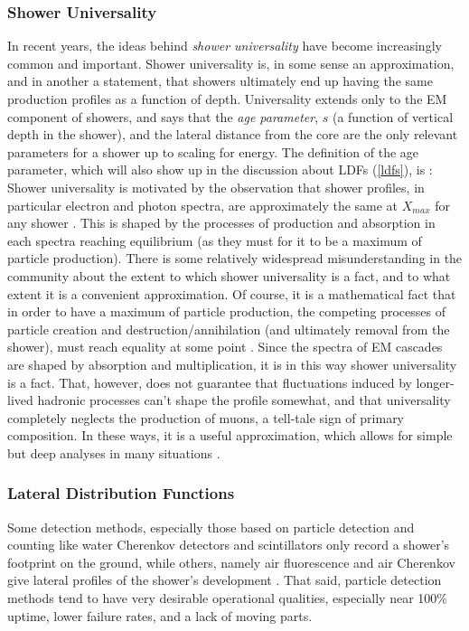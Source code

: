 \subsubsection{Shower Universality}
\label{universality}
In recent years, the ideas behind \textit{shower universality} have become increasingly common and important. Shower universality is, in some sense an approximation, and in another a statement, that showers ultimately end up having the same production profiles as a function of depth. Universality extends only to the EM component of showers, and says that the \textit{age parameter}, $s$ (a function of vertical depth in the shower), and the lateral distance from the core are the only relevant parameters for a shower up to scaling for energy. The definition of the age parameter, which will also show up in the discussion about LDFs (\autoref{ldfs}), is \cite{crapp2}:
Shower universality is motivated by the observation that shower profiles, in particular electron and photon spectra, are approximately the same at $X_{max}$ for any shower \cite{universality}. This is shaped by the processes of production and absorption in each spectra reaching equilibrium (as they must for it to be a maximum of particle production). There is some relatively widespread misunderstanding in the community about the extent to which shower universality is a fact, and to what extent it is a convenient approximation. Of course, it is a mathematical fact that in order to have a maximum of particle production, the competing processes of particle creation and destruction/annihilation (and ultimately removal from the shower), must reach equality at some point \cite{crapp2}.  Since the spectra of EM cascades are shaped by absorption and multiplication, it is in this way shower universality is a fact. That, however, does not guarantee that fluctuations induced by longer-lived hadronic processes can't shape the profile somewhat, and that universality completely neglects the production of muons, a tell-tale sign of primary composition. In these ways, it is a useful approximation, which allows for simple but deep analyses in many situations \cite{universality}.
\subsubsection{Lateral Distribution Functions}
\label{ldfs}
Some detection methods, especially those based on particle detection and counting like water Cherenkov detectors and scintillators only record a shower's footprint on the ground, while others, namely air fluorescence and air Cherenkov give lateral profiles of the shower's development \cite{schroeder}. That said, particle detection methods tend to have very desirable operational qualities, especially near 100\% uptime, lower failure rates, and a lack of moving parts. 

